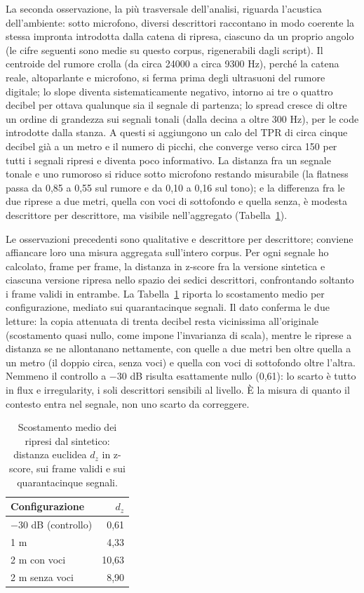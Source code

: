 \documentclass{article}
\begin{document}
La seconda osservazione, la più trasversale dell'analisi, riguarda l'acustica dell'ambiente: sotto microfono, diversi descrittori raccontano in modo coerente la stessa impronta introdotta dalla catena di ripresa, ciascuno da un proprio angolo (le cifre seguenti sono medie su questo corpus, rigenerabili dagli script). Il centroide del rumore crolla (da circa 24000 a circa 9300 Hz), perché la catena reale, altoparlante e microfono, si ferma prima degli ultrasuoni del rumore digitale; lo slope diventa sistematicamente negativo, intorno ai tre o quattro decibel per ottava qualunque sia il segnale di partenza; lo spread cresce di oltre un ordine di grandezza sui segnali tonali (dalla decina a oltre 300 Hz), per le code introdotte dalla stanza. A questi si aggiungono un calo del TPR di circa cinque decibel già a un metro e il numero di picchi, che converge verso circa 150 per tutti i segnali ripresi e diventa poco informativo. La distanza fra un segnale tonale e uno rumoroso si riduce sotto microfono restando misurabile (la flatness passa da 0,85 a 0,55 sul rumore e da 0,10 a 0,16 sul tono); e la differenza fra le due riprese a due metri, quella con voci di sottofondo e quella senza, è modesta descrittore per descrittore, ma visibile nell'aggregato (Tabella~\ref{tab:deriva}).

Le osservazioni precedenti sono qualitative e descrittore per descrittore; conviene affiancare loro una misura aggregata sull'intero corpus. Per ogni segnale ho calcolato, frame per frame, la distanza in z-score fra la versione sintetica e ciascuna versione ripresa nello spazio dei sedici descrittori, confrontando soltanto i frame validi in entrambe. La Tabella~\ref{tab:deriva} riporta lo scostamento medio per configurazione, mediato sui quarantacinque segnali. Il dato conferma le due letture: la copia attenuata di trenta decibel resta vicinissima all'originale (scostamento quasi nullo, come impone l'invarianza di scala), mentre le riprese a distanza se ne allontanano nettamente, con quelle a due metri ben oltre quella a un metro (il doppio circa, senza voci) e quella con voci di sottofondo oltre l'altra. Nemmeno il controllo a $-30$ dB risulta esattamente nullo (0,61): lo scarto è tutto in flux e irregularity, i soli descrittori sensibili al livello. È la misura di quanto il contesto entra nel segnale, non uno scarto da correggere.

\begin{table}[t]
\centering
\small
\begin{tabular*}{\columnwidth}{@{\extracolsep{\fill}}lr@{}}
\toprule
Configurazione & $d_z$ \\
\midrule
$-30$ dB (controllo) & 0,61 \\
1 m                  & 4,33 \\
2 m con voci         & 10,63 \\
2 m senza voci       & 8,90 \\
\bottomrule
\end{tabular*}
\caption{Scostamento medio dei ripresi dal sintetico: distanza euclidea $d_z$ in z-score, sui frame validi e sui quarantacinque segnali.}
\label{tab:deriva}
\end{table}
\end{document}
